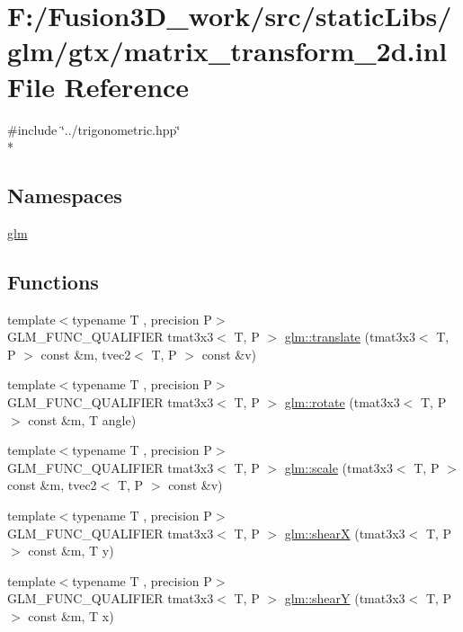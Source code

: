 \hypertarget{matrix__transform__2d_8inl}{}\section{F\+:/\+Fusion3\+D\+\_\+work/src/static\+Libs/glm/gtx/matrix\+\_\+transform\+\_\+2d.inl File Reference}
\label{matrix__transform__2d_8inl}
{\ttfamily \#include \char`\"{}../trigonometric.\+hpp\char`\"{}}\\*
\subsection*{Namespaces}
\begin{DoxyCompactItemize}
\item 
 \hyperlink{namespaceglm}{glm}
\end{DoxyCompactItemize}
\subsection*{Functions}
\begin{DoxyCompactItemize}
\item 
{\footnotesize template$<$typename T , precision P$>$ }\\G\+L\+M\+\_\+\+F\+U\+N\+C\+\_\+\+Q\+U\+A\+L\+I\+F\+I\+E\+R tmat3x3$<$ T, P $>$ \hyperlink{group__gtx__matrix__transform__2d_ga3786656ac137084ef73151636eff44d8}{glm\+::translate} (tmat3x3$<$ T, P $>$ const \&m, tvec2$<$ T, P $>$ const \&v)
\item 
{\footnotesize template$<$typename T , precision P$>$ }\\G\+L\+M\+\_\+\+F\+U\+N\+C\+\_\+\+Q\+U\+A\+L\+I\+F\+I\+E\+R tmat3x3$<$ T, P $>$ \hyperlink{group__gtx__matrix__transform__2d_ga23ec870ee4b75d85cc021e0fd1532b48}{glm\+::rotate} (tmat3x3$<$ T, P $>$ const \&m, T angle)
\item 
{\footnotesize template$<$typename T , precision P$>$ }\\G\+L\+M\+\_\+\+F\+U\+N\+C\+\_\+\+Q\+U\+A\+L\+I\+F\+I\+E\+R tmat3x3$<$ T, P $>$ \hyperlink{group__gtx__matrix__transform__2d_gadb9f2a729d399ae5e9c33eb64d0d66fe}{glm\+::scale} (tmat3x3$<$ T, P $>$ const \&m, tvec2$<$ T, P $>$ const \&v)
\item 
{\footnotesize template$<$typename T , precision P$>$ }\\G\+L\+M\+\_\+\+F\+U\+N\+C\+\_\+\+Q\+U\+A\+L\+I\+F\+I\+E\+R tmat3x3$<$ T, P $>$ \hyperlink{group__gtx__matrix__transform__2d_gab3363478cb625e40c5bd924fd838cf54}{glm\+::shear\+X} (tmat3x3$<$ T, P $>$ const \&m, T y)
\item 
{\footnotesize template$<$typename T , precision P$>$ }\\G\+L\+M\+\_\+\+F\+U\+N\+C\+\_\+\+Q\+U\+A\+L\+I\+F\+I\+E\+R tmat3x3$<$ T, P $>$ \hyperlink{group__gtx__matrix__transform__2d_ga69bfb47d250df7464a5b14f2b95a9b4a}{glm\+::shear\+Y} (tmat3x3$<$ T, P $>$ const \&m, T x)
\end{DoxyCompactItemize}
